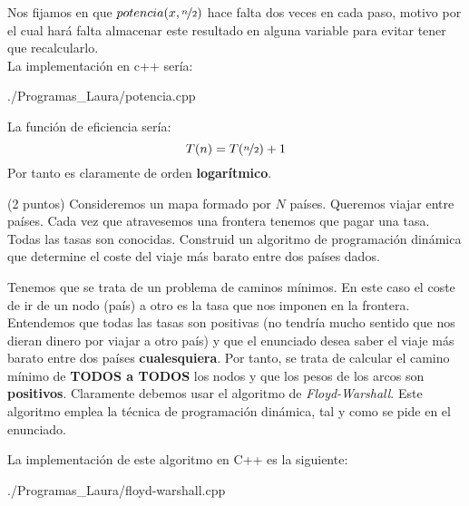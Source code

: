 \documentclass[12pt]{article}
\begin{document}
\begin{ejercicio}
        Nos fijamos en que $potencia(x,\nicefrac{n}{2})$ hace falta dos veces 
        en cada paso, motivo por el cual hará falta almacenar este resultado 
        en alguna variable para evitar tener que recalcularlo.\\
        La implementación en c++ sería:

        \begin{minipage}{0.9\linewidth} %
            
            {./Programas_Laura/potencia.cpp}
        \end{minipage}

        La función de eficiencia sería:
        \begin{equation*}
            T(n) = T(\nicefrac{n}{2}) + 1
        \end{equation*}
        Por tanto es claramente de orden \textbf{logarítmico}.
    \end{ejercicio}

    \begin{ejercicio}
        (2 puntos) Consideremos un mapa formado por $N$ países. 
        Queremos viajar entre países. Cada vez
        que atravesemos una frontera tenemos que pagar una tasa. 
        Todas las tasas son conocidas. Construid
        un algoritmo de programación dinámica que determine el 
        coste del viaje más barato entre dos países
        dados.

        Tenemos que se trata de un problema de caminos mínimos.
        En este caso el coste de ir de un nodo (país) a otro 
        es la tasa que nos imponen en la frontera.
        Entendemos 
        que todas las tasas son positivas (no tendría mucho 
        sentido que nos dieran dinero por viajar a otro país) 
        y que el enunciado desea saber el viaje más barato entre 
        dos países \textbf{cualesquiera}. Por tanto, se trata 
        de calcular el camino mínimo de \textbf{TODOS a TODOS} los nodos 
        y que los pesos de los arcos son \textbf{positivos}.
        Claramente debemos usar el algoritmo de \textit{Floyd-Warshall}.
        Este algoritmo emplea la técnica de programación dinámica,
        tal y como se pide en el enunciado.

        La implementación de este algoritmo en C++ es la siguiente:

        \begin{minipage}{0.9\linewidth} %
            
            {./Programas_Laura/floyd-warshall.cpp}
        \end{minipage}
    \end{ejercicio}
\end{document}
